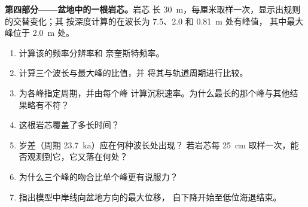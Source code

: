 \begin{problem}
\medskip\noindent\textbf{第四部分——盆地中的一根岩芯。}岩芯
长 \qty{30}{m}，每厘米取样一次，显示出规则的交替变化；其
按深度计算的在波长为 7.5、2.0 和 \qty{0.81}{m} 处有峰值，
其中最大峰位于 \qty{2.0}{m} 处。
\begin{enumerate}[resume]
\item 计算该的频率分辨率和
  奈奎斯特频率。
\item 计算三个波长与最大峰的比值，并
  将其与轨道周期进行比较。
\item 为各峰指定周期，并由每个峰
  计算沉积速率。为什么最长的那个峰与其他结果略有不符？
\item 这根岩芯覆盖了多长时间？
\item 岁差（周期 \qty{23.7}{ka}）应在何种波长处出现？
  若岩芯每 \qty{25}{cm} 取样一次，能否观测到它，它又落在何处？
\item 为什么三个峰的吻合比单个峰更有说服力？
\item 指出模型中岸线向盆地方向的最大位移，
  自下降开始至低位海退结束。
\end{enumerate}
\end{problem}
